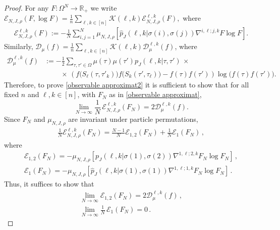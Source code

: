\documentclass[10pt,a4paper]{amsart}
\let\O=\Omega
\let\m=\mu   \let\n=\nu
\let\r=\rho \let\s=\sigma \let\t=\tau
\let\t=\tau
\newcommand{\bbR}{{\ensuremath{\mathbb R}} }
\newcommand{\cA}{\ensuremath{\mathcal A}}
\newcommand{\cD}{\ensuremath{\mathcal D}}
\newcommand{\cE}{\ensuremath{\mathcal E}}
\newcommand{\cK}{\ensuremath{\mathcal K}}
\newcommand{\tc}{\,|\,}
\begin{document}
\begin{proof}
For any $F:\O^N\to \bbR_+$ we write 
$
\cE_{N,J,\r}(F,\log F)=\frac1n\sum_{\ell,k\in[n]}\cK(\ell,k)\cE^{\ell,k}_{N,J,\r}(F),
$ where
\begin{eqnarray}
    \cE^{\ell,k}_{N,J,\r}(F):=-\frac{1}{N}\sum_{i,j=1}^N\mu_{N,J,\r}\left[\hat p_J(\ell,k|\sigma(i),\sigma(j))\nabla^{i,\ell;j,k}F\log F\right].
\end{eqnarray} 
Similarly, %
$\cD_\mu(f)=\frac1n\sum_{\ell,k\in[n]}\cK(\ell,k)\cD_\mu^{\ell,k}(f)$, where 
\begin{align}
    \cD_\m^{\ell,k}(f)&:=-\frac12\sum_{\tau,\tau'\in\Omega}\mu(\tau)\mu(\tau')p_J(\ell,k|\tau,\tau') \,\times\;\nonumber\\
    &\qquad \;\times \,\left(f\big(S_\ell(\tau,\tau'_k)\big)f\big(S_k(\tau',\tau_\ell)\big)-f(\tau)f(\tau')\right)\log\big(f(\tau)f(\tau')\big).
\end{align}
Therefore, 
to prove \eqref{observable approximat2} it is sufficient to show that for all fixed $n$ and $\ell,k\in[n]$, with $F_N$ as in \eqref{observable approximat},
    \begin{equation}\label{observable approximat21}
    \lim_{N \to \infty} \frac{1}{N}\,  \cE^{\ell,k}_{N,J,\r}(F_N) = 2\cD_\m^{\ell,k}(f).
    \end{equation}
 Since \(F_N\) and $\mu_{N,J,\r}$ are invariant under particle permutations, 
 \begin{align*}
  \frac1{N} \cE^{\ell,k}_{N,J,\r}(F_N)    = \frac{N - 1}{N} \cE_{1,2}(F_N) +  \frac1{N} \cE_{1}(F_N)\,,
\end{align*}
where
 \begin{gather*}
 \cE_{1,2}(F_N)  = -\mu_{N,J,\r}\left[p_J(\ell,k|\sigma(1),\sigma(2))\nabla^{1,\ell;2,k}F_N\log F_N\right]\,,
\\
 \cE_{1}(F_N)  = -\mu_{N,J,\r}\left[\hat p_J(\ell,k|\sigma(1),\sigma(1))\nabla^{1,\ell;1,k}F_N\log F_N\right]\,.
\end{gather*}
Thus, it suffices to show that 
\begin{gather}
    \lim_{N \to \infty}  \cE_{1,2}(F_N)= 2\cD_\m^{\ell,k}(f)\,,\label{eq:topo1}\\
    \lim_{N \to \infty}  \frac1N \,\cE_{1}(F_N)=0\label{eq:topo2}\,.

\end{gather}
\end{proof}
\end{document}
